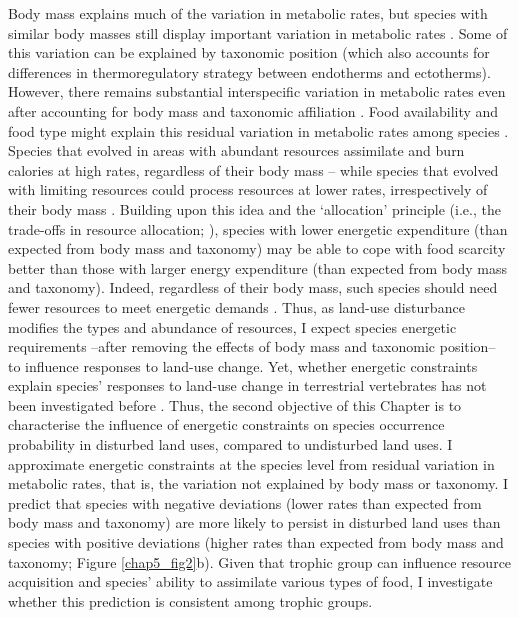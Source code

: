 Body mass explains much of the variation in metabolic rates, but species with similar body masses still display important variation in metabolic rates \citep{Mueller2001}. Some of this variation can be explained by taxonomic position (which also accounts for differences in thermoregulatory strategy between endotherms and ectotherms). However, there remains substantial interspecific variation in metabolic rates even after accounting for body mass and taxonomic affiliation \citep{Mueller2001, White2013}. Food availability and food type might explain this residual variation in metabolic rates among species \citep{Mueller2001}. Species that evolved in areas with abundant resources assimilate and burn calories at high rates, regardless of their body mass -- while species that evolved with limiting resources could process resources at lower rates, irrespectively of their body mass \citep{Mueller2001}. Building upon this idea and the `allocation' principle (i.e., the trade-offs in resource allocation; \citet{Auer2020}), species with lower energetic expenditure (than expected from body mass and taxonomy) may be able to cope with food scarcity better than those with larger energy expenditure (than expected from body mass and taxonomy). Indeed, regardless of their body mass, such species should need fewer resources to meet energetic demands \citep{Clarke2004a}. Thus, as land-use disturbance modifies the types and abundance of resources, I expect species energetic requirements --after removing the effects of body mass and taxonomic position-- to influence responses to land-use change. Yet, whether energetic constraints explain species' responses to land-use change in terrestrial vertebrates has not been investigated before \citep{Hevia2017}. Thus, the second objective of this Chapter is to characterise the influence of energetic constraints on species occurrence probability in disturbed land uses, compared to undisturbed land uses. I approximate energetic constraints at the species level from residual variation in metabolic rates, that is, the variation not explained by body mass or taxonomy. I predict that species with negative deviations (lower rates than expected from body mass and taxonomy) are more likely to persist in disturbed land uses than species with positive deviations (higher rates than expected from body mass and taxonomy; Figure \ref{chap5_fig2}b). Given that trophic group can influence resource acquisition and species' ability to assimilate various types of food, I investigate whether this prediction is consistent among trophic groups.

